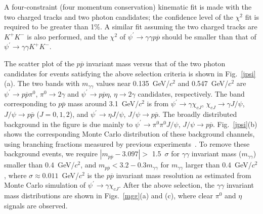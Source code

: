 \documentclass[prd,twocolumn,showpacs,amsmath,amssymb]{revtex4}
\newcommand{\jpsi}{J/\psi}
\newcommand{\chicJ}{\chi_{cJ}}
\newcommand{\piz}{\pi^0}
\newcommand{\ppb}{p\overline{p}}
\newcommand{\jpsito}{J/\psi \rightarrow }
\newcommand{\psipto}{\psi^\prime \rightarrow }
\newcommand{\pspto}{\psi^\prime \rightarrow }
\newcommand{\chicJto}{\chi_{cJ} \rightarrow }
\newcommand{\KK}{K^+K^-}
\newcommand{\g}{\gamma}
\begin{document}
A four-constraint (four momentum conservation) kinematic fit is
made with the two charged tracks and two photon candidates; the
confidence level of the $\chi^2$ fit is required to be greater
than 1\%. A similar fit assuming the two charged tracks are $\KK$
is also performed, and the $\chi^2$ of $\psipto \gamma\gamma\ppb$
should be smaller than that of $\psipto \gamma\gamma\KK$.

The scatter plot of the $\ppb$ invariant mass versus that of the
two photon candidates for events satisfying the above selection
criteria is shown in Fig.~\ref{jpsi}(a). The two bands with
$m_{\gamma\gamma}$ values near 0.135~GeV/$c^2$ and 0.547~GeV/$c^2$
are $\psipto \ppb \piz$, $\piz \to 2\gamma$ and $\psipto \ppb
\eta$, $\eta \to 2\gamma$ candidates, respectively. The band
corresponding to $\ppb$ mass around 3.1~GeV/$c^2$ is from $\pspto
\g \chicJ$, $\chicJto \g \jpsi$, $\jpsito \ppb$ ($J=0,1,2$), and
$\pspto \eta \jpsi$, $\jpsito \ppb$. The broadly distributed
background in the figure is due mainly to $\psipto \piz \piz
\jpsi$, $\jpsito \ppb$. Fig.~\ref{jpsi}(b) shows the corresponding
Monte Carlo distribution of these background channels, using
branching fractions measured by previous experiments~\cite{pdg}.
To remove these background events, we require $|m_{\ppb}-3.097|>$
1.5~$\sigma$ for $\g\g$ invariant mass ($m_{\g\g}$) smaller than
0.4~GeV/$c^2$, and $m_{\ppb}<3.2-0.3 m_{\g\g}$ for $m_{\g\g}$
larger than 0.4~GeV/$c^2$, where $\sigma\approx 0.011$~GeV/$c^2$
is the $\ppb$ invariant mass resolution as estimated from Monte
Carlo simulation of $\pspto \g\chicJ$. After the above selection,
the $\g\g$ invariant mass distributions are shown in
Figs.~\ref{mgg}(a) and (c), where clear $\piz$ and $\eta$ signals
are observed.

\begin{figure*}[htbp]
\centerline{\hbox{ }}
\caption{Scatter plots of $\ppb$ invariant mass versus $\g\g$
invariant mass before removing $\jpsi$ background. (a) is from
data and (b) is from Monte Carlo simulated $\pspto \g \chicJ$,
$\chicJto \g \jpsi$, $\jpsito \ppb$ ($J=0,1,2$), $\pspto \eta
\jpsi$, $\jpsito \ppb$, and $\psipto \piz \piz \jpsi$, $\jpsito
\ppb$ events. The lines show the selection criterion described in
the text.} \label{jpsi}
\end{figure*}

\begin{figure*}[htbp]
\centerline{\hbox{
}}
\caption{Invariant mass distributions of $\gamma\gamma$ from the
selected $\pspto \g\g \ppb$ candidate events in data and in Monte
Carlo simulation described in Section V: (a) $\ppb\piz$ data, (b)
$\ppb\piz$ Monte Carlo simulation, (c) $\ppb\eta$ data, and (d)
$\ppb\eta$ Monte Carlo simulation. The curves show the best fit to
the distributions.} \label{mgg}
\end{figure*}
\end{document}
